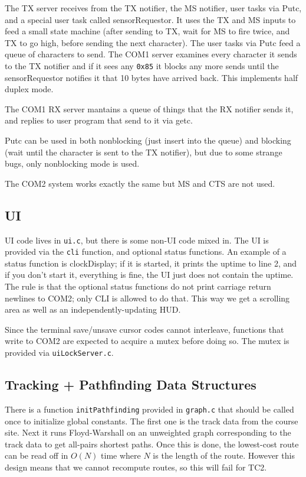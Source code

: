 \documentclass{article}
\begin{document}
The TX server receives from the TX notifier, the MS notifier, user tasks via Putc, and a special user task called sensorRequestor. It uses the TX and MS inputs to feed a small state machine (after sending to TX, wait for MS to fire twice, and TX to go high, before sending the next character). The user tasks via Putc feed a queue of characters to send. The COM1 server examines every character it sends to the TX notifier and if it sees any \texttt{0x85} it blocks any more sends until the sensorRequestor notifies it that 10 bytes have arrived back. This implements half duplex mode.

The COM1 RX server mantains a queue of things that the RX notifier sends it, and replies to user program that send to it via getc.

Putc can be used in both nonblocking (just insert into the queue) and blocking (wait until the character is sent to the TX notifier), but due to some strange bugs, only nonblocking mode is used.

The COM2 system works exactly the same but MS and CTS are not used.

\subsection*{UI}

UI code lives in \texttt{ui.c}, but there is some non-UI code mixed in. The UI is provided via the \texttt{cli} function, and optional status functions. An example of a status function is clockDisplay; if it is started, it prints the uptime to line 2, and if you don't start it, everything is fine, the UI just does not contain the uptime. The rule is that the optional status functions do not print carriage return newlines to COM2; only CLI is allowed to do that. This way we get a scrolling area as well as an independently-updating HUD.

Since the terminal save/unsave cursor codes cannot interleave, functions that write to COM2 are expected to acquire a mutex before doing so. The mutex is provided via \texttt{uiLockServer.c}.

\subsection*{Tracking + Pathfinding Data Structures}

There is a function \texttt{initPathfinding} provided in \texttt{graph.c} that should be called once to initialize global constants. The first one is the track data from the course site. Next it runs Floyd-Warshall on an unweighted graph corresponding to the track data to get all-pairs shortest paths. Once this is done, the lowest-cost route can be read off in $O(N)$ time where $N$ is the length of the route. However this design means that we cannot recompute routes, so this will fail for TC2.
\end{document}

